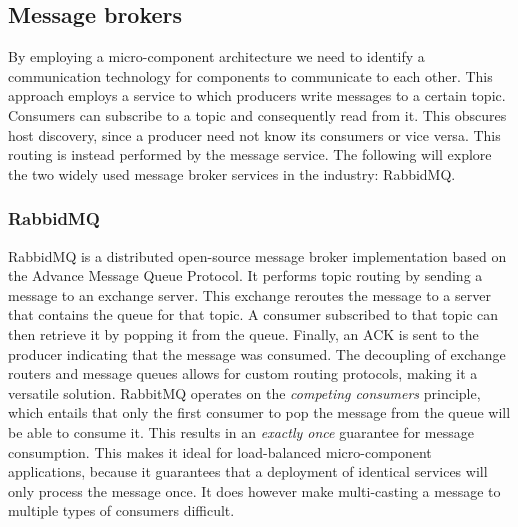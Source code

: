 \subsection{Message brokers}
By employing a micro-component architecture we need to identify a communication technology for components to communicate to each other. This approach employs a service to which producers write messages to a certain topic. Consumers can subscribe to a topic and consequently read from it. This obscures host discovery, since a producer need not know its consumers or vice versa. This routing is instead performed by the message service. The following will explore the two widely used message broker services in the industry: RabbidMQ.

\subsubsection*{RabbidMQ}
RabbidMQ\cite{web:rabbidmg} is a distributed open-source message broker implementation based on the Advance Message Queue Protocol. It performs topic routing by sending a message to an exchange server. This exchange reroutes the message to a server that contains the queue for that topic. A consumer subscribed to that topic can then retrieve it by popping it from the queue. Finally, an ACK is sent to the producer indicating that the message was consumed. The decoupling of exchange routers and message queues allows for custom routing protocols, making it a versatile solution. RabbitMQ operates on the \emph{competing consumers} principle, which entails that only the first consumer to pop the message from the queue will be able to consume it. This results in an \emph{exactly once} guarantee for message consumption. This makes it ideal for load-balanced micro-component applications, because it guarantees that a deployment of identical services will only process the message once. It does however make multi-casting a message to multiple types of consumers difficult.

